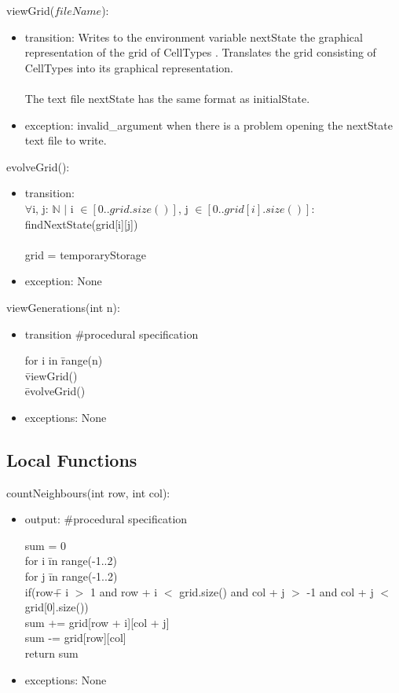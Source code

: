 \documentclass[12pt]{article}
\begin{document}
\noindent viewGrid($fileName$):
\begin{itemize}
\item transition: Writes to the environment variable nextState the graphical representation of the grid of CellTypes . Translates the grid consisting of CellTypes into its graphical representation. \\\\
The text file nextState has the same format as initialState.
\item exception: invalid\_argument when there is a problem opening the nextState text file to write. 
\end{itemize}

\noindent evolveGrid():
\begin{itemize}
\item transition:\\
$ \forall $i, j: $ \mathbb{N} $ $|$ i $ \in [0..grid.size()]$, j $ \in [0..grid[i].size()] $: findNextState(grid[i][j])\\\\
grid = temporaryStorage
\item exception: None
\end{itemize}

\noindent viewGenerations(int n):
\begin{itemize}
\item transition \#procedural specification
\begin{tabbing}
	for i in \= range(n) \\
	\> \= viewGrid() \\
	\> \= evolveGrid()
\end{tabbing}
\item exceptions: None
\end{itemize}

\subsection*{Local Functions}
\noindent countNeighbours(int row, int col):
\begin{itemize}
	
	\item output: \#procedural specification
	\begin{tabbing}
		sum = 0\\
		for i \=in range(-1..2)\\
		\>for j \=in range(-1..2)\\
		\>\>if(row\= + i $>$ 1 and row + i $<$ grid.size() and col + j $>$ -1 and col + j $<$ grid[0].size())\\
		\>\>\>sum += grid[row + i][col + j]\\
		sum -= grid[row][col]\\
		return sum
	\end{tabbing}

	\item exceptions: None
	
\end{itemize}
\end{document}
